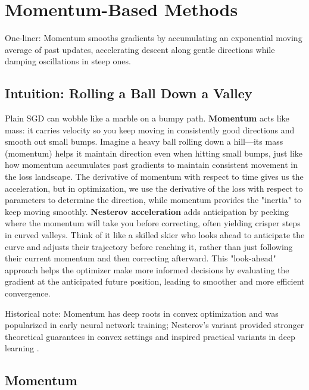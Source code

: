 
\section{Momentum-Based Methods }
\noindent One-liner: Momentum smooths gradients by accumulating an exponential moving average of past updates, accelerating descent along gentle directions while damping oscillations in steep ones.
\label{sec:momentum}

\subsection{Intuition: Rolling a Ball Down a Valley}

Plain SGD can wobble like a marble on a bumpy path. \textbf{Momentum} acts like mass: it carries velocity so you keep moving in consistently good directions and smooth out small bumps. Imagine a heavy ball rolling down a hill—its mass (momentum) helps it maintain direction even when hitting small bumps, just like how momentum accumulates past gradients to maintain consistent movement in the loss landscape. The derivative of momentum with respect to time gives us the acceleration, but in optimization, we use the derivative of the loss with respect to parameters to determine the direction, while momentum provides the "inertia" to keep moving smoothly. \textbf{Nesterov acceleration} adds anticipation by peeking where the momentum will take you before correcting, often yielding crisper steps in curved valleys. Think of it like a skilled skier who looks ahead to anticipate the curve and adjusts their trajectory before reaching it, rather than just following their current momentum and then correcting afterward. This "look-ahead" approach helps the optimizer make more informed decisions by evaluating the gradient at the anticipated future position, leading to smoother and more efficient convergence.

Historical note: Momentum has deep roots in convex optimization and was popularized in early neural network training; Nesterov's variant provided stronger theoretical guarantees in convex settings and inspired practical variants in deep learning \cite{Polyak1964,Nesterov1983,GoodfellowEtAl2016,Bishop2006}.

\subsection{Momentum}

